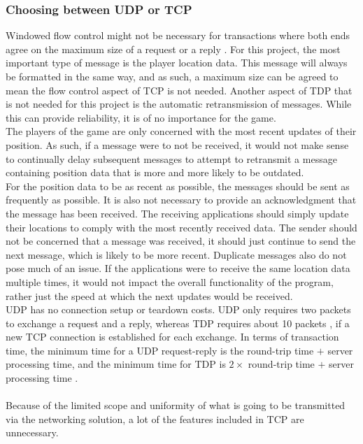 \subsubsection{Choosing between UDP or TCP}
Windowed flow control might not be necessary for transactions where both ends agree on the maximum size of a request or a reply \cite{socketnetworking}.
For this project, the most important type of message is the player location data.
This message will always be formatted in the same way, and as such, a maximum size can be agreed to mean the flow control aspect of TCP is not needed.
Another aspect of TDP that is not needed for this project is the automatic retransmission of messages.
While this can provide reliability, it is of no importance for the game.\\
The players of the game are only concerned with the most recent updates of their position.
As such, if a message were to not be received, it would not make sense to continually delay subsequent messages to attempt to retransmit a message containing position data that is more and more likely to be outdated.\\
For the position data to be as recent as possible, the messages should be sent as frequently as possible.
It is also not necessary to provide an acknowledgment that the message has been received.
The receiving applications should simply update their locations to comply with the most recently received data.
The sender should not be concerned that a message was received, it should just continue to send the next message, which is likely to be more recent.
Duplicate messages also do not pose much of an issue.
If the applications were to receive the same location data multiple times, it would not impact the overall functionality of the program, rather just the speed at which the next updates would be received.\\
UDP has no connection setup or teardown costs.
UDP only requires two packets to exchange a request and a reply, whereas TDP requires about 10 packets \cite{socketnetworking}, if a new TCP connection is established for each exchange.
In terms of transaction time, the minimum time for a UDP request-reply is the round-trip time $+$ server processing time, and the minimum time for TDP is $2 \times$ round-trip time $+$ server processing time \cite{socketnetworking}.
\\\\
Because of the limited scope and uniformity of what is going to be transmitted via the networking solution, a lot of the features included in TCP are unnecessary.
